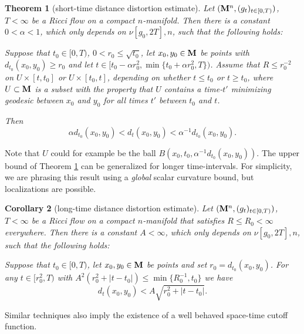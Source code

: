 \documentclass[11pt]{amsart}
\numberwithin{equation}{section}
\newtheorem{theorem}{Theorem}[section]
\newtheorem{corollary}[theorem]{Corollary}
\def\lab{\label}
\def\M{{\bf M}}
\numberwithin{equation}{section}
\begin{document}
\begin{theorem}[short-time distance distortion estimate] \lab{thdistcon} 
Let $(\M^n, (g_t)_{t \in [0,T)})$, $T < \infty$ be a Ricci flow on a compact $n$-manifold.
Then there is a constant $0 < \alpha <1$, which only depends on $\nu [g_0, 2T], n$, such that the following holds:

Suppose that $t_0 \in [0,T)$, $0 < r_0 \leq  \sqrt{t_0}$, let $x_0, y_0 \in \M$ be points with $d_{t_0} (x_0, y_0 ) \geq r_0$ and let $t \in [t_0 - \alpha r_0^2, \min \{ t_0 + \alpha r_0^2, T \})$.
Assume that $R \leq r_0^{-2}$ on $U \times [t, t_0]$ or $U \times [t_0, t]$, depending on whether $t \leq t_0$ or $t \geq t_0$, where $U \subset \M$ is a subset with the property that $U$ contains a time-$t'$ minimizing geodesic between $x_0$ and $y_0$ for all times $t'$ between $t_0$ and $t$.

Then
\[ \alpha d_{t_0} (x_0, y_0) < d_t (x_0, y_0) < \alpha^{-1} d_{t_0} (x_0, y_0). \]
\end{theorem}

Note that $U$ could for example be the ball $B(x_0, t_0, \alpha^{-1} d_{t_0} (x_0, y_0))$.
The upper bound of Theorem \ref{thdistcon} can be generalized for longer time-intervals.
For simplicity, we are phrasing this result using a \emph{global} scalar curvature bound, but localizations are possible.

\begin{corollary}[long-time distance distortion estimate] \lab{coBDP}
Let $(\M^n, (g_t)_{t \in [0,T)})$, $T< \infty$ be a Ricci flow on a compact $n$-manifold that satisfies $R\leq R_0 < \infty$ everywhere.
Then there is a constant $A < \infty$, which only depends on $\nu[g_0, 2T], n$, such that the following holds:

Suppose that $t_0 \in [0,T)$, let $x_0, y_0 \in \M$ be points and set $r_0 = d_{t_0} (x_0, y_0 )$.
For any $t \in [r_0^2, T)$ with $A^2 (r_0^2 + | t - t_0|)  \leq \min \{ R_0^{-1}, t_0 \}$ we have
\[ d_t (x_0, y_0 ) < A \sqrt{ r_0 ^2+ | t - t_0|}. \]
\end{corollary}

Similar techniques also imply the existence of a well behaved space-time cutoff function.
\end{document}
